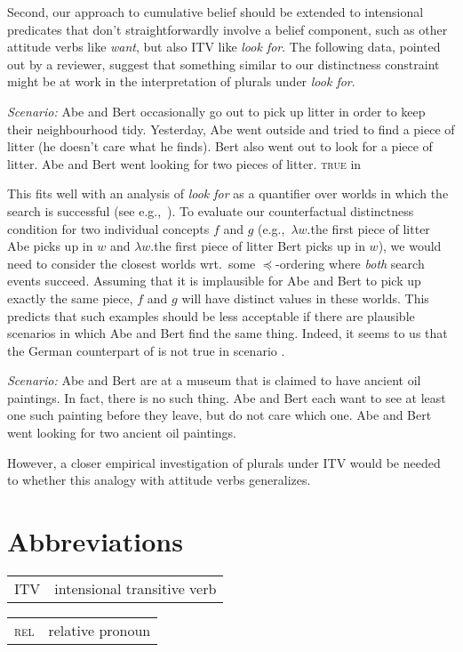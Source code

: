 \documentclass[output=paper]{langscibook}
\begin{document}
Second, our approach to cumulative belief should be extended to intensional predicates that don't straightforwardly involve a belief component, such as other attitude verbs like \textit{want}, but also ITV like \textit{look for}. The following data, pointed out by a reviewer, suggest that something similar to our distinctness constraint might be at work in the interpretation of plurals under \textit{look for}. 

\eanoraggedright
\eanoraggedright \label{sch-has:ex:rev2a}\textit{Scenario:} Abe and Bert occasionally go out to pick up litter in order to
keep their neighbourhood tidy. Yesterday, Abe went outside and tried to
find a piece of litter (he doesn’t care what he finds). Bert also went out to
look for a piece of litter.
\ex \label{sch-has:ex:rev2}Abe and Bert went looking for two pieces of litter. \hfill \textsc{true} in 
\z\z

\noindent This fits well with an analysis of \textit{look for} as a quantifier over worlds in which the search is successful (see e.g.,~\citealt{Zimmermann:1993,Zimmermann:2006}). To evaluate our counterfactual distinctness condition for two individual concepts $f$ and $g$ (e.g.,~$\lambda w.$the first piece of litter Abe picks up in $w$ and $\lambda w.$the first piece of litter Bert picks up in $w$), we would need to consider the closest worlds wrt.~some $\preceq$-ordering where \textit{both} search events succeed. Assuming that it is implausible for Abe and Bert to pick up exactly the same piece, $f$ and $g$ will have distinct values in these worlds. This predicts that such examples should be less acceptable if there are plausible scenarios in which Abe and Bert find the same thing. Indeed, it seems to us that the German counterpart of  is not true in scenario .

\eanoraggedright 
\eanoraggedright \label{sch-has:ex:rev3a} \textit{Scenario:} Abe and Bert are at a museum that is claimed to have ancient oil paintings. In fact, there is no such thing. Abe and Bert each want to see at least one such painting before they leave, but do not care which one.
\ex \label{sch-has:ex:rev3} Abe and Bert went looking for two ancient oil paintings. \z\z

\noindent However, a closer empirical investigation of plurals under ITV would be needed to whether this analogy with attitude verbs generalizes.

\section*{Abbreviations}
\begin{tabularx}{.5\textwidth}{@{}lQ}
ITV & intensional transitive verb \\
\end{tabularx}%
\begin{tabularx}{.5\textwidth}{lQ@{}}
\textsc{rel} & relative pronoun \\
\end{tabularx}
\end{document}
